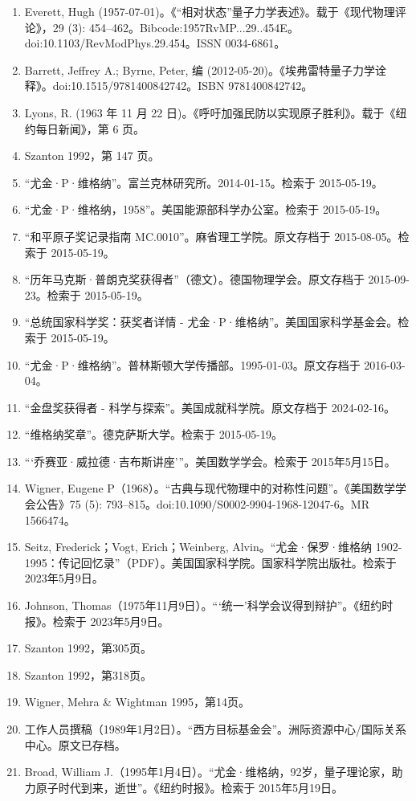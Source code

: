 \begin{enumerate}
\item Everett, Hugh (1957-07-01)。《“相对状态”量子力学表述》。载于《现代物理评论》，29 (3): 454–462。Bibcode:1957RvMP...29..454E。doi:10.1103/RevModPhys.29.454。ISSN 0034-6861。
\item Barrett, Jeffrey A.; Byrne, Peter, 编 (2012-05-20)。《埃弗雷特量子力学诠释》。doi:10.1515/9781400842742。ISBN 9781400842742。
\item Lyons, R. (1963 年 11 月 22 日)。《呼吁加强民防以实现原子胜利》。载于《纽约每日新闻》，第 6 页。
\item Szanton 1992，第 147 页。
\item “尤金·P·维格纳”。富兰克林研究所。2014-01-15。检索于 2015-05-19。
\item “尤金·P·维格纳，1958”。美国能源部科学办公室。检索于 2015-05-19。
\item “和平原子奖记录指南 MC.0010”。麻省理工学院。原文存档于 2015-08-05。检索于 2015-05-19。
\item “历年马克斯·普朗克奖获得者”（德文）。德国物理学会。原文存档于 2015-09-23。检索于 2015-05-19。
\item “总统国家科学奖：获奖者详情 - 尤金·P·维格纳”。美国国家科学基金会。检索于 2015-05-19。
\item “尤金·P·维格纳”。普林斯顿大学传播部。1995-01-03。原文存档于 2016-03-04。
\item “金盘奖获得者 - 科学与探索”。美国成就科学院。原文存档于 2024-02-16。
\item “维格纳奖章”。德克萨斯大学。检索于 2015-05-19。
\item “‘乔赛亚·威拉德·吉布斯讲座’”。美国数学学会。检索于 2015年5月15日。
\item Wigner, Eugene P（1968）。“古典与现代物理中的对称性问题”。《美国数学学会公告》75 (5): 793–815。doi:10.1090/S0002-9904-1968-12047-6。MR 1566474。
\item Seitz, Frederick；Vogt, Erich；Weinberg, Alvin。“尤金·保罗·维格纳 1902-1995：传记回忆录”（PDF）。美国国家科学院。国家科学院出版社。检索于 2023年5月9日。
\item Johnson, Thomas（1975年11月9日）。“‘统一’科学会议得到辩护”。《纽约时报》。检索于 2023年5月9日。
\item Szanton 1992，第305页。
\item Szanton 1992，第318页。
\item Wigner, Mehra & Wightman 1995，第14页。
\item 工作人员撰稿（1989年1月2日）。“西方目标基金会”。洲际资源中心/国际关系中心。原文已存档。
\item Broad, William J.（1995年1月4日）。“尤金·维格纳，92岁，量子理论家，助力原子时代到来，逝世”。《纽约时报》。检索于 2015年5月19日。
\end{enumerate}
